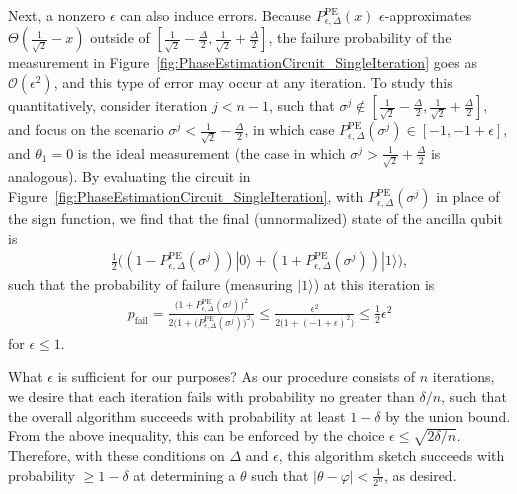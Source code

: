 \documentclass[aps,pra,showpacs,notitlepage,twocolumn,superscriptaddress,nofootinbib]{revtex4-1}
\begin{document}
    
    Next, a nonzero $\epsilon$ can also induce errors. Because $P^{\text{PE}}_{\epsilon,\Delta}(x)$ $\epsilon$-approximates $\Theta\left(\frac{1}{\sqrt{2}} - x\right)$ outside of $\left[\frac{1}{\sqrt{2}} - \frac{\Delta}{2}, \frac{1}{\sqrt{2}} + \frac{\Delta}{2} \right]$, the failure probability of the measurement in Figure~\ref{fig:PhaseEstimationCircuit_SingleIteration} goes as $\mathcal{O}(\epsilon^2)$, and this type of error may occur at any iteration. To study this quantitatively, consider iteration $j < n-1$, such that $\sigma^j \notin \left[\frac{1}{\sqrt{2}} - \frac{\Delta}{2}, \frac{1}{\sqrt{2}} + \frac{\Delta}{2} \right]$, and focus on the scenario $\sigma^j < \frac{1}{\sqrt{2}} - \frac{\Delta}{2}$, in which case $P^{\text{PE}}_{\epsilon,\Delta}(\sigma^j) \in [-1,-1+\epsilon]$, and $\theta_1 = 0$ is the ideal measurement (the case in which $\sigma^j > \frac{1}{\sqrt{2}} + \frac{\Delta}{2}$ is analogous). By evaluating the circuit in Figure~\ref{fig:PhaseEstimationCircuit_SingleIteration}, with $P^{\text{PE}}_{\epsilon,\Delta}(\sigma^j)$ in place of the sign function, we find that the final (unnormalized) state of the ancilla qubit is
    \begin{equation}
    \begin{gathered}
        \frac{1}{2} \Big( \left(1-P^{\text{PE}}_{\epsilon,\Delta}(\sigma^j)\right)|0\rangle + \left(1+P^{\text{PE}}_{\epsilon,\Delta}(\sigma^j) \right)|1\rangle \Big),
    \end{gathered}
    \end{equation}
    such that the probability of failure (measuring $|1\rangle$) at this iteration is 
    \begin{equation}
    \begin{gathered}
        p_{\text{fail}} =  \frac{\big(1+P^{\text{PE}}_{\epsilon,\Delta}(\sigma^j)\big)^2}{2\Big(1+\big(P^{\text{PE}}_{\epsilon,\Delta}(\sigma^j)\big)^2\Big)}
        \leq \frac{\epsilon^2}{2\big( 1+ (-1+\epsilon)^2 \big)} \leq \frac{1}{2}\epsilon^2
    \end{gathered}
    \end{equation}
    for $\epsilon \leq 1$.
    
    What $\epsilon$ is sufficient for our purposes? As our procedure consists of $n$ iterations, we desire that each iteration fails with probability no greater than $\delta /n$, such that the overall algorithm succeeds with probability at least $ 1-\delta$ by the union bound. From the above inequality, this can be enforced by the choice $\epsilon \leq \sqrt{2\delta/n}$. Therefore, with these conditions on $\Delta$ and $\epsilon$, this algorithm sketch succeeds with probability $\geq 1-\delta$ at determining a $\theta$ such that $|\theta - \varphi| < \frac{1}{2^n}$, as desired.
    
\end{document}
